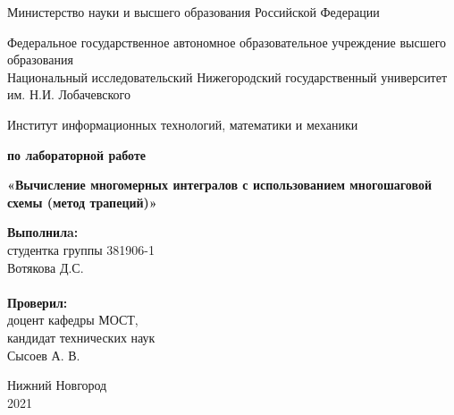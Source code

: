 \documentclass{report}
\begin{document}
\begin{titlepage}

\begin{center}
Министерство науки и высшего образования Российской Федерации
\end{center}

\begin{center}
Федеральное государственное автономное образовательное учреждение высшего образования \\
Национальный исследовательский Нижегородский государственный университет им. Н.И. Лобачевского
\end{center}

\begin{center}
Институт информационных технологий, математики и механики
\end{center}

\vspace{4em}

\begin{center}
\textbf{ по лабораторной работе} \\
\end{center}
\begin{center}
\textbf{\Large«Вычисление многомерных интегралов с использованием многошаговой схемы 
(метод трапеций)»} \\
\end{center}

\vspace{4em}

\newbox{\lbox}
\newlength{\maxl}
\setlength{\maxl}{\wd\lbox}
\hfill\parbox{7cm}{
\hspace*{5cm}\hspace*{-5cm}\textbf{Выполнилa:} \\ студентка группы 381906-1 \\ Вотякова Д.С. \\
\\
\hspace*{5cm}\hspace*{-5cm}\textbf{Проверил:}\\ доцент кафедры МОСТ, \\ кандидат технических наук \\ Сысоев А. В.\\
}
\vspace{\fill}

\begin{center} Нижний Новгород \\ 2021 \end{center}

\end{titlepage}
\end{document}
